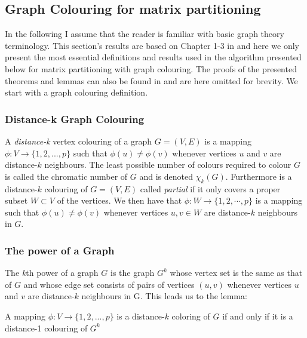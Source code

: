 \subsection{Graph Colouring for matrix partitioning}
\label{sec:partitioning}
In the following I assume that the reader is familiar with basic graph theory terminology. 
This section's results are based on Chapter 1-3 in \cite{Jacobian} and here
we  only present the most essential definitions and results used in the algorithm presented 
below for matrix partitioning with graph colouring. The proofs of the presented theorems and lemmas 
can also be found in \cite{Jacobian} and are here omitted for brevity.
We start with a graph colouring definition. 
\subsubsection*{Distance-k Graph Colouring}
\begin{definition}
A \textit{distance-k} vertex colouring of a graph $G = (V,E)$ is a mapping $\phi : V \to \{1,2,..., p\}$ such that $\phi(u) \not= \phi(v)$ whenever vertices $u$ and $v$ are distance-$k$ neighbours. The least possible number of colours required to colour $G$ is called the chromatic number of $G$ and is denoted $\chi_k(G)$. Furthermore is a distance-$k$ colouring of $G = (V,E)$ called \emph{partial} if it only covers a proper subset $W \subset V$ of the vertices. We then have that $\phi: W \to \{1,2, \cdots, p\}$ is a mapping such that  $\phi(u) \not= \phi(v)$ whenever vertices $u, v \in W$ are distance-$k$ neighbours in $G$.  
\end{definition}

\subsubsection*{The power of a Graph}
\begin{definition}
The \emph{k}th power of a graph $G$ is the graph $G^k$ whose vertex set is the same as that of $G$ and whose edge set consists of pairs of vertices $(u,v)$ whenever vertices $u$ and $v$ are distance-$k$ neighbours in G. 
This leads us to the  lemma:
\end{definition}
\begin{lemma}
A mapping $\phi : V \to \{1,2,..., p\}$ is a distance-$k$ coloring of $G$ if and only if it is a distance-1 colouring of $G^k$
\end{lemma}

